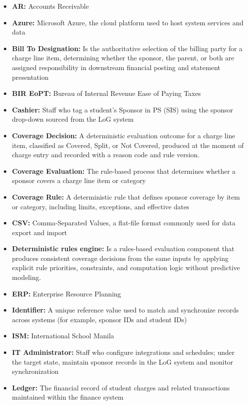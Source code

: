     \begin{itemize}
  \item \textbf{AR:} Accounts Receivable
  \item \textbf{Azure:} Microsoft Azure, the cloud platform used to host system services and data
  \item \textbf{Bill To Designation:} Is the authoritative selection of the billing party for a charge line item, determining whether the sponsor, the parent, or both are assigned responsibility in downstream financial posting and statement presentation
  \item \textbf{BIR EoPT:} Bureau of Internal Revenue Ease of Paying Taxes
  \item \textbf{Cashier:} Staff who tag a student’s Sponsor in PS (SIS) using the sponsor drop-down sourced from the LoG system
  \item \textbf{Coverage Decision:} A deterministic evaluation outcome for a charge line item, classified as Covered, Split, or Not Covered, produced at the moment of charge entry and recorded with a reason code and rule version.
  \item \textbf{Coverage Evaluation:} The rule-based process that determines whether a sponsor covers a charge line item or category
  \item \textbf{Coverage Rule:} A deterministic rule that defines sponsor coverage by item or category, including limits, exceptions, and effective dates
  \item \textbf{CSV:} Comma-Separated Values, a flat-file format commonly used for data export and import
  \item \textbf{Deterministic rules engine:} Is a rules-based evaluation component that produces consistent coverage decisions from the same inputs by applying explicit rule priorities, constraints, and computation logic without predictive modeling.
  \item \textbf{ERP:} Enterprise Resource Planning
  \item \textbf{Identifier:} A unique reference value used to match and synchronize records across systems (for example, sponsor IDs and student IDs)
  \item \textbf{ISM:} International School Manila
  \item \textbf{IT Administrator:} Staff who configure integrations and schedules; under the target state, maintain sponsor records in the LoG system and monitor synchronization
  \item \textbf{Ledger:} The financial record of student charges and related transactions maintained within the finance system

\end{itemize}
